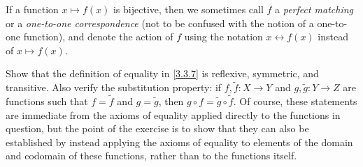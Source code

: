 \setcounter{thm}{22}
\begin{rmk}\label{3.3.23}
  If a function \(x \mapsto f(x)\) is bijective, then we sometimes call \(f\) a \emph{perfect matching} or a \emph{one-to-one correspondence} (not to be confused with the notion of a one-to-one function), and denote the action of \(f\) using the notation \(x \leftrightarrow f(x)\) instead of \(x \mapsto f(x)\).
\end{rmk}

\exercisesection

\begin{ex}\label{ex:3.3.1}
  Show that the definition of equality in \cref{3.3.7} is reflexive, symmetric, and transitive.
  Also verify the substitution property: if \(f, \tilde{f} : X \to Y\) and \(g, \tilde{g} : Y \to Z\) are functions such that \(f = \tilde{f}\) and \(g = \tilde{g}\), then \(g \circ f = \tilde{g} \circ \tilde{f}\).
  Of course, these statements are immediate from the axioms of equality applied directly to the functions in question, but the point of the exercise is to show that they can also be established by instead applying the axioms of equality to elements of the domain and codomain of these functions, rather than to the functions itself.
\end{ex}


